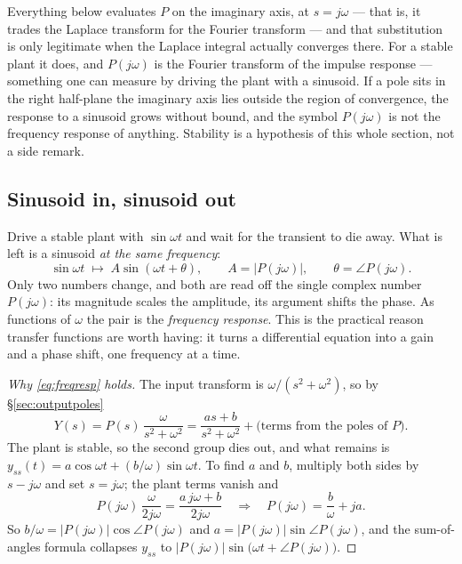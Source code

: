 \documentclass[11pt]{article}
\begin{document}
\begin{remark}
Everything below evaluates $P$ on the imaginary axis, at $s=j\omega$ --- that is,
it trades the Laplace transform for the Fourier transform --- and that substitution
is only legitimate when the Laplace integral actually converges there. For a
stable plant it does, and $P(j\omega)$ is the Fourier transform of the impulse
response --- something one can measure by driving the plant with a sinusoid. If a
pole sits in the right half-plane the imaginary axis lies outside the region of
convergence, the response to a sinusoid grows without bound, and the symbol
$P(j\omega)$ is not the frequency response of anything. Stability is a hypothesis
of this whole section, not a side remark.
\end{remark}

\subsection{Sinusoid in, sinusoid out}
Drive a stable plant with $\sin\omega t$ and wait for the transient to die away.
What is left is a sinusoid \emph{at the same frequency}:
\begin{equation}\label{eq:freqresp}
   \sin\omega t \;\longmapsto\; A\sin(\omega t+\theta),
   \qquad A = |P(j\omega)|,\qquad \theta = \angle P(j\omega).
\end{equation}
Only two numbers change, and both are read off the single complex number
$P(j\omega)$: its magnitude scales the amplitude, its argument shifts the phase.
As functions of $\omega$ the pair is the \emph{frequency response}. This is the
practical reason transfer functions are worth having: it turns a differential
equation into a gain and a phase shift, one frequency at a time.

\begin{proof}[Why \eqref{eq:freqresp} holds]
The input transform is $\omega/(s^{2}+\omega^{2})$, so by \S\ref{sec:outputpoles}
\[
   Y(s) = P(s)\,\frac{\omega}{s^{2}+\omega^{2}}
        = \frac{as+b}{s^{2}+\omega^{2}} + \bigl(\text{terms from the poles of }P\bigr).
\]
The plant is stable, so the second group dies out, and what remains is
$y_{ss}(t) = a\cos\omega t+(b/\omega)\sin\omega t$. To find $a$ and $b$, multiply
both sides by $s-j\omega$ and set $s=j\omega$; the plant terms vanish and
\[
   P(j\omega)\,\frac{\omega}{2j\omega} = \frac{a\,j\omega+b}{2j\omega}
   \quad\Longrightarrow\quad
   P(j\omega) = \frac{b}{\omega} + j a .
\]
So $b/\omega=|P(j\omega)|\cos\angle P(j\omega)$ and $a=|P(j\omega)|\sin\angle
P(j\omega)$, and the sum-of-angles formula collapses $y_{ss}$ to
$|P(j\omega)|\sin\bigl(\omega t+\angle P(j\omega)\bigr)$.
\end{proof}
\end{document}
